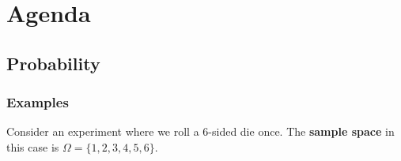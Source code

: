 \documentclass{article}
\theoremstyle{plain}
\theoremstyle{box}
\begin{document}

\newpage
\section{Agenda}
\subsection{Probability}

\subsubsection{Examples}
Consider an experiment where we roll a 6-sided die once. The \textbf{sample space} in this case is $\Omega = \{1,2,3,4,5,6\}$.
\end{document}
